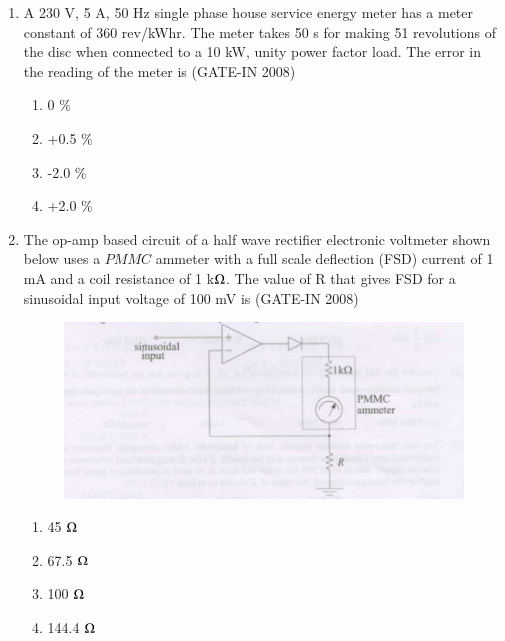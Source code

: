 \documentclass[journal,12pt,onecolumn]{IEEEtran}
\theoremstyle{remark}
\begin{document}
\begin{enumerate}
\item  A 230 V, 5 A, 50 Hz single phase house service energy meter has a meter constant of
360 rev/kWhr. The meter takes 50 s for making 51 revolutions of the disc when connected to a
10 kW, unity power factor load. The error in the reading of the meter is \hfill{(GATE-IN 2008)}
\begin{multicols}{4}
           \begin{enumerate} 
              \item 0 \%          
              \item +0.5 \%
              \item -2.0 \%
              \item +2.0 \%
            \end{enumerate}
            \end{multicols}
 
\item  The op-amp based circuit of a half wave rectifier electronic voltmeter shown below  uses a $PMMC$ 
ammeter with a full scale deflection (FSD) current of 1 mA and a coil resistance of 1 k$\ohm$. The value
of R that gives FSD for a sinusoidal input voltage of 100 mV  is \hfill{(GATE-IN 2008)}
\begin{figure}[H]
    \centering
    \includegraphics[width=0.5\columnwidth]{figs/i24.jpg}
    \caption{}
    \label{fig:placeholder24}
\end{figure}
\begin{multicols}{4}
           \begin{enumerate} 
              \item 45 $\ohm$   
              \item 67.5 $\ohm$
              \item 100 $\ohm$
              \item 144.4 $\ohm$
            \end{enumerate}
            \end{multicols}

\newpage


\end{enumerate}
\end{document}
